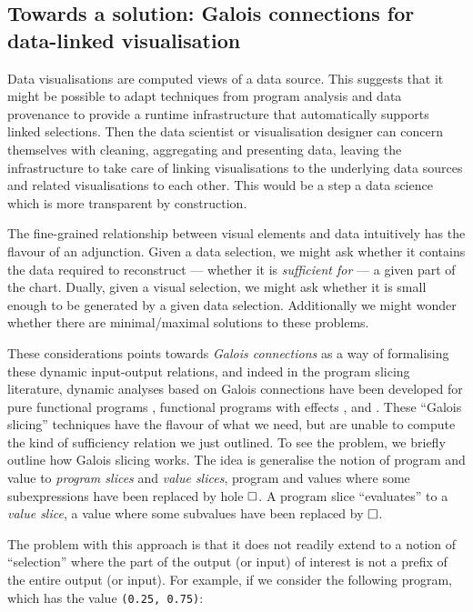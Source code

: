 

\subsection{Towards a solution: Galois connections for data-linked visualisation}

Data visualisations are computed views of a data source. This suggests that it might be possible to adapt techniques from program analysis and data provenance to provide a runtime infrastructure that automatically supports linked selections. Then the data scientist or visualisation designer can concern themselves with cleaning, aggregating and presenting data, leaving the infrastructure to take care of linking visualisations to the underlying data sources and related visualisations to each other. This would be a step a data science which is more transparent by construction.

The fine-grained relationship between visual elements and data intuitively has the flavour of an adjunction. Given a data selection, we might ask whether it contains the data required to reconstruct --- whether it is \emph{sufficient for} --- a given part of the chart. Dually, given a visual selection, we might ask whether it is small enough to be generated by a given data selection. Additionally we might wonder whether there are minimal/maximal solutions to these problems.

These considerations points towards \emph{Galois connections} as a way of formalising these dynamic input-output relations, and indeed in the program slicing literature, dynamic analyses based on Galois connections have been developed for pure functional programs \cite{perera12a}, functional programs with effects \cite{ricciotti17}, and \piCalculus \cite{perera16d}. These ``Galois slicing'' techniques have the flavour of what we need, but are unable to compute the kind of sufficiency relation we just outlined. To see the problem, we briefly outline how Galois slicing works. The idea is generalise the notion of program and value to \emph{program slices} and \emph{value slices}, program and values where some subexpressions have been replaced by hole $\square$. A program slice ``evaluates'' to a \emph{value slice}, a value where some subvalues have been replaced by $\square$.

The problem with this approach is that it does not readily extend to a notion of ``selection'' where the part of the output (or input) of interest is not a prefix of the entire output (or input). For example, if we consider the following program, which has the value \lstinline{(0.25, 0.75)}:

